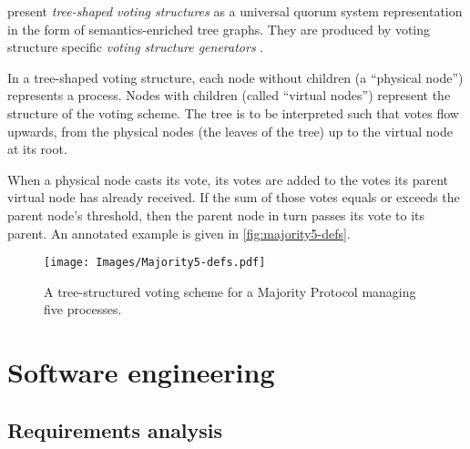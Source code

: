 \documentclass[11pt,chapterprefix=true,toc=bibliography,numbers=noendperiod,
               footnotes=multiple,twoside]{scrreprt}
\begin{document}

\citeauthor{generators} present \emph{tree-shaped voting structures} as a universal quorum system representation in the form of semantics-enriched tree graphs. They are produced by voting structure specific \emph{voting structure generators} \autocite{generators}.

In a tree-shaped voting structure, each node without children (a \enquote{physical node}) represents a process. Nodes with children (called \enquote{virtual nodes}) represent the structure of the voting scheme. The tree is to be interpreted such that votes flow upwards, from the physical nodes (the leaves of the tree) up to the virtual node at its root.

When a physical node casts its vote, its votes are added to the votes its parent virtual node has already received. If the sum of those votes equals or exceeds the parent node's threshold, then the parent node in turn passes its vote to its parent. An annotated example is given in \autoref{fig:majority5-defs}.

\begin{figure}[h]
    \centering
    \texttt{[image: Images/Majority5-defs.pdf]}
    \caption[Tree-structured voting scheme for a Majority Protocol]{A tree-structured voting scheme for a Majority Protocol managing five processes.}
    \label{fig:majority5-defs}
\end{figure}

\section{Software engineering\label{sc:software-engineering}}

\subsection{Requirements analysis\label{sc:requirements-analysis}}
\end{document}
